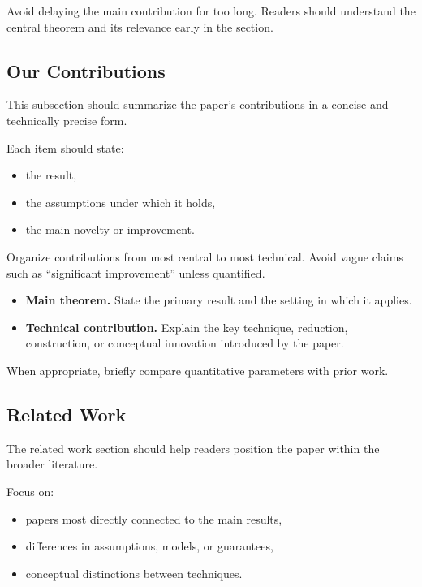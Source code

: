 \documentclass[
    letterpaper,
    runningheads,
    USenglish
  ]{llncs}
\begin{document}
Avoid delaying the main contribution for too long. Readers should
understand the central theorem and its relevance early in the section.


\subsection{Our Contributions}
\label{sec:contributions}

This subsection should summarize the paper's contributions in a concise
and technically precise form.

Each item should state:
\begin{itemize}
	\item the result,
	\item the assumptions under which it holds,
	\item the main novelty or improvement.
\end{itemize}

Organize contributions from most central to most technical. Avoid vague
claims such as ``significant improvement'' unless quantified.

\begin{itemize}
	\item \textbf{Main theorem.}
	      State the primary result and the setting in which it applies.
	\item \textbf{Technical contribution.}
	      Explain the key technique, reduction, construction, or conceptual
	      innovation introduced by the paper.
\end{itemize}

When appropriate, briefly compare quantitative parameters with prior
work.


\subsection{Related Work}
\label{sec:related}

The related work section should help readers position the paper within
the broader literature.

Focus on:
\begin{itemize}
	\item papers most directly connected to the main results,
	\item differences in assumptions, models, or guarantees,
	\item conceptual distinctions between techniques.
\end{itemize}
\end{document}
